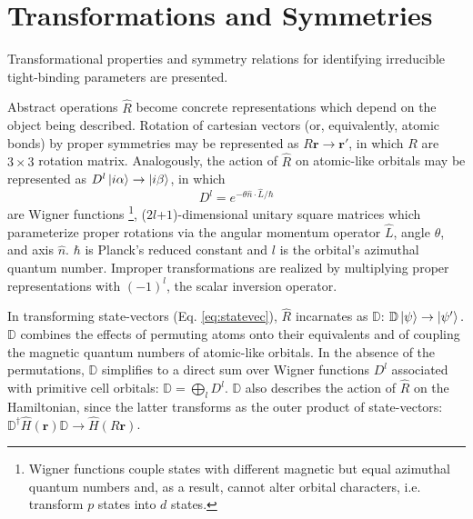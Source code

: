 \documentclass[twocolumn,showpacs,preprintnumbers,superscriptaddress,prb,floatfix,aps,10pt]{revtex4-1}
\renewcommand{\vec}[1]{\ensuremath{\mathbf{#1}}}
\newcommand*{\ham}{\hat{H}}
\newcommand*{\wignerD}{\mathbb{D}}%
\newcommand*{\wignerDl}{D^{l}}%
\begin{document}

\section{\label{appendix:symmetries} Transformations and Symmetries}
Transformational properties and symmetry relations for identifying irreducible tight-binding parameters are presented. 

Abstract operations $\hat{R}$ become concrete representations which depend on the object being described. Rotation of cartesian vectors (or, equivalently, atomic bonds) by proper symmetries may be represented as $ R \vec{r} \rightarrow \vec{r} '$, in which $R$ are $3\times3$ rotation matrix. Analogously, the action of $\hat{R}$ on atomic-like orbitals may be represented as $\wignerDl\ket{i\alpha} \rightarrow \ket{i\beta}$, in which 
\begin{equation}
\wignerDl = e^{- \theta \hat{n} \cdot \hat{L} /\hbar}
\end{equation}
are Wigner functions \footnote{Wigner functions couple states with different magnetic but equal azimuthal quantum numbers and, as a result, cannot alter orbital characters, i.e. transform $p$ states into $d$ states.}, ($2l$+$1$)-dimensional unitary square matrices which parameterize proper rotations via the angular momentum operator $\hat{L}$, angle $\theta$, and axis $\hat{n}$. $\hbar$ is Planck's reduced constant and $l$ is the orbital's azimuthal quantum number. Improper transformations are realized by multiplying proper representations with $(-1)^l$, the scalar inversion operator.\cite{sharma_general_1979,el-batanouny_symmetry_2008} %

In transforming state-vectors (Eq. \ref{eq:statevec}), $\hat{R}$ incarnates as $\wignerD$: $\wignerD \ket{\psi} \rightarrow \ket{\psi'}.$ $\wignerD$ combines the effects of permuting atoms onto their equivalents and of coupling the magnetic quantum numbers of atomic-like orbitals. In the absence of the permutations, $\wignerD$ simplifies to a direct sum over Wigner functions $\wignerDl$ associated with primitive cell orbitals: $\wignerD = \bigoplus_l \wignerDl$. $\wignerD$ also describes the action of $\hat{R}$ on the Hamiltonian, since the latter transforms as the outer product of state-vectors: $\mathbb{D}^\dag \ham(\vec{r}) \wignerD \rightarrow \ham( R\vec{r})$. \cite{el-batanouny_symmetry_2008} %
\end{document}
